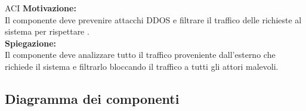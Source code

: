 \begin{listaPersonale}{ACI}
    \textbf{Motivazione:}\\
    Il componente deve prevenire attacchi DDOS e filtrare il traffico delle richieste al sistema per rispettare .\\
    \textbf{Spiegazione:}\\
    Il componente deve analizzare tutto il traffico proveniente dall'esterno che richiede il sistema e filtrarlo bloccando il traffico a tutti gli attori malevoli.
\end{listaPersonale}






































\subsection{Diagramma dei componenti}
\label{secD2:DiagrammaComponenti}

